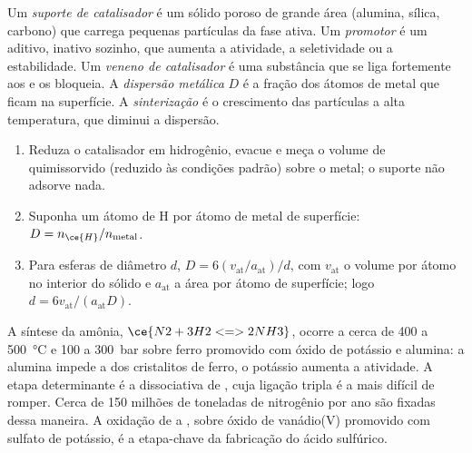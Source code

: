 \begin{definition}\label{def:b3:surfaces-catalysis:catalyst-design}
Um \emph{suporte de catalisador} é um sólido poroso de grande
área (alumina, sílica, carbono) que carrega pequenas partículas da fase ativa. Um
\emph{promotor} é um aditivo, inativo sozinho, que aumenta a
atividade, a seletividade ou a estabilidade. Um \emph{veneno de catalisador}
é uma substância que se liga fortemente aos  e os bloqueia.
A \emph{dispersão metálica} $D$ é a fração dos átomos de
metal que ficam na superfície. A \emph{sinterização} é o
crescimento das partículas a alta temperatura, que diminui a dispersão.
\end{definition}

\begin{method}\label{met:b3:surfaces-catalysis:dispersion}
\begin{enumerate}
  \item Reduza o catalisador em hidrogênio, evacue e meça o volume de 
        quimissorvido (reduzido às condições padrão) sobre o metal; o suporte não
        adsorve nada.
  \item Suponha um átomo de H por átomo de metal de superfície: $D = n_{\ce{H}}/n_{\text{metal}}$.
  \item Para esferas de diâmetro $d$, $D = 6(v_{\mathrm{at}}/a_{\mathrm{at}})/d$, com $v_{\mathrm{at}}$ o volume por átomo no
        interior do sólido e $a_{\mathrm{at}}$ a área por átomo de superfície; logo $d = 6v_{\mathrm{at}}/(a_{\mathrm{at}}D)$.
\end{enumerate}
\end{method}

A síntese da amônia, $\ce{N2 + 3 H2 <=> 2 NH3}$, ocorre a cerca de 400 a \qty{500}{\celsius} e 100 a
\qty{300}{bar} sobre ferro promovido com óxido de potássio e alumina: a alumina impede a
 dos cristalitos de ferro, o potássio aumenta a atividade. A etapa
determinante é a  dissociativa de , cuja ligação tripla é a
mais difícil de romper. Cerca de 150 milhões de toneladas de nitrogênio por ano são
fixadas dessa maneira.
A oxidação de  a , sobre óxido de vanádio(V) promovido com sulfato
de potássio, é a etapa-chave da fabricação do ácido sulfúrico.

